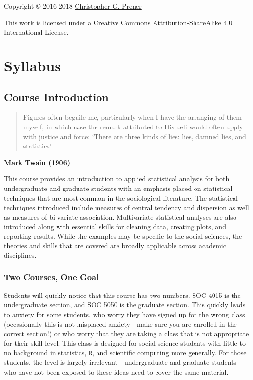 \documentclass[]{book}
\theoremstyle{definition}
\theoremstyle{definition}
\theoremstyle{definition}
\theoremstyle{remark}
\begin{document}
Copyright © 2016-2018 \href{https://chris-prener.github.io}{Christopher
G. Prener}

This work is licensed under a Creative Commons Attribution-ShareAlike
4.0 International License.

\hypertarget{part-syllabus}{%
\part{Syllabus}\label{part-syllabus}}

\hypertarget{course-introduction}{%
\chapter{Course Introduction}\label{course-introduction}}

\begin{quote}
Figures often beguile me, particularly when I have the arranging of them
myself; in which case the remark attributed to Disraeli would often
apply with justice and force: `There are three kinds of lies: lies,
damned lies, and statistics'.
\end{quote}

\textbf{Mark Twain (1906)}

This course provides an introduction to applied statistical analysis for
both undergraduate and graduate students with an emphasis placed on
statistical techniques that are most common in the sociological
literature. The statistical techniques introduced include measures of
central tendency and dispersion as well as measures of bi-variate
association. Multivariate statistical analyses are also introduced along
with essential skills for cleaning data, creating plots, and reporting
results. While the examples may be specific to the social sciences, the
theories and skills that are covered are broadly applicable across
academic disciplines.

\hypertarget{two-courses-one-goal}{%
\section{Two Courses, One Goal}\label{two-courses-one-goal}}

Students will quickly notice that this course has two numbers. SOC 4015
is the undergraduate section, and SOC 5050 is the graduate section. This
quickly leads to anxiety for some students, who worry they have signed
up for the wrong class (occasionally this is not misplaced anxiety -
make sure you are enrolled in the correct section!) or who worry that
they are taking a class that is not appropriate for their skill level.
This class is designed for social science students with little to no
background in statistics, \texttt{R}, and scientific computing more
generally. For those students, the level is largely irrelevant -
undergraduate and graduate students who have not been exposed to these
ideas need to cover the same material.
\end{document}
